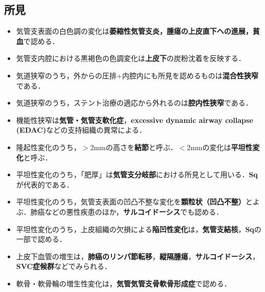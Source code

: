 \subsection{所見}
\begin{itemize}


\item 気管支表面の白色調の変化は\textbf{萎縮性気管支炎，腫瘍の上皮直下への進展，貧血}で認める．
\item 気管支内腔における黒褐色の色調変化は\textbf{上皮下}の炭粉沈着を反映する．
\item 気道狭窄のうち，外からの圧排+内腔内にも所見を認めるものは\textbf{混合性狭窄}である．
\item 気道狭窄のうち，ステント治療の適応から外れるのは\textbf{腔内性狭窄}である．
\item 機能性狭窄は\textbf{気管・気管支軟化症}，\textbf{excessive dynamic airway collapse (EDAC)}などの支持組織の異常による．

\item 隆起性変化のうち，$>$2mmの高さを\textbf{結節}と呼ぶ．$<$2mmの変化は\textbf{平坦性変化}と呼ぶ．
\item 平坦性変化のうち，「肥厚」は\textbf{気管支分岐部}における所見として用いる．\textbf{Sq}が代表的である．
\item 平坦性変化のうち，気管支表面の凹凸不整な変化を\textbf{顆粒状（凹凸不整）}とよぶ．肺癌などの悪性疾患のほか，\textbf{サルコイドーシス}でも認める．
\item 平坦性変化のうち，上皮組織の欠損による\textbf{陥凹性変化}は，\textbf{気管支結核}，\textbf{Sq}の一部で認める．

\item 上皮下血管の増生は，\textbf{肺癌のリンパ節転移}，\textbf{縦隔腫瘍}，\textbf{サルコイドーシス}，\textbf{SVC症候群}などでみられる．
\item 軟骨・軟骨輪の増生性変化は，\textbf{気管気管支骨軟骨形成症}で認める．

\end{itemize}
